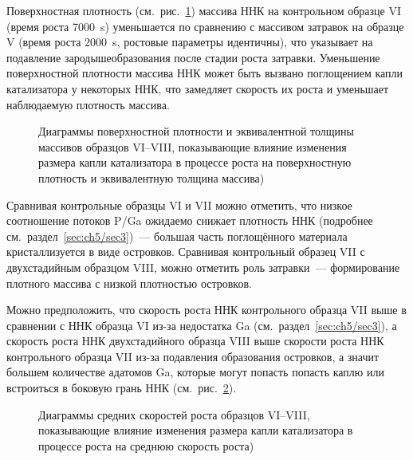 Поверхностная плотность (см.~рис.~\cref{fig:Image_44_1}) массива ННК на
контрольном образце VI (время роста 7000~\si{\second}) уменьшается по
сравнению с массивом затравок на образце V (время роста 2000~\si{\second},
ростовые параметры идентичны), что указывает на подавление зародышеобразования
после стадии роста затравки. Уменьшение поверхностной плотности массива ННК
может быть вызвано поглощением капли катализатора у некоторых ННК, что
замедляет скорость их роста и уменьшает наблюдаемую плотность массива.

\begin{figure}[ht]   \caption{Диаграммы поверхностной плотности и
		эквивалентной толщины массивов образцов VI--VIII, показывающие влияние
		изменения размера капли катализатора в процессе роста на поверхностную
плотность и эквивалентную толщина массива)}\label{fig:Image_44_1} \end{figure}

Сравнивая контрольные образцы VI и VII можно отметить, что низкое соотношение
потоков P/Ga ожидаемо снижает плотность ННК (подробнее
см.~раздел~\cref{sec:ch5/sec3})~--- большая часть поглощённого
материала кристаллизуется в виде островков. Сравнивая контрольный образец VII
с двухстадийным образцом VIII, можно отметить роль затравки~--- формирование
плотного массива с низкой плотностью островков.

Можно предположить, что скорость роста ННК контрольного образца VII выше в
сравнении с ННК образца VI из-за недостатка Ga
(см.~раздел~\cref{sec:ch5/sec3}), а скорость роста ННК
двухстадийного образца VIII выше скорости роста ННК контрольного образца VII
из-за подавления образования островков, а значит большем количестве адатомов
Ga, которые могут попасть попасть каплю или встроиться в боковую грань ННК
(см.~рис.~\cref{fig:Image_44_2}).

\begin{figure}[ht]   \caption{Диаграммы средних скоростей роста образцов
		VI--VIII, показывающие влияние изменения размера капли катализатора в
процессе роста на среднюю скорость роста)}\label{fig:Image_44_2} \end{figure}

